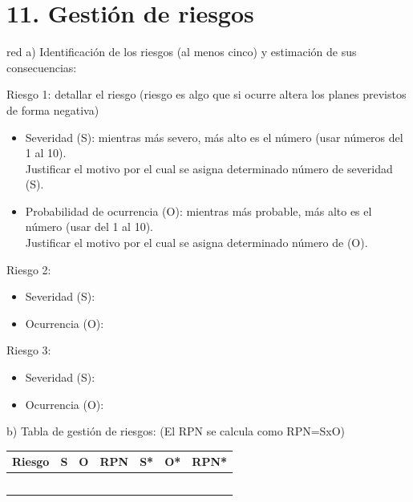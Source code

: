 \documentclass[
11pt, %
codirector, %
]{charter}
\begin{document}
\section{11. Gestión de riesgos}
\label{sec:riesgos}

\begin{consigna}{red}
a) Identificación de los riesgos (al menos cinco) y estimación de sus consecuencias:
 
Riesgo 1: detallar el riesgo (riesgo es algo que si ocurre altera los planes previstos de forma negativa)
\begin{itemize}
	\item Severidad (S): mientras más severo, más alto es el número (usar números del 1 al 10).\\
	Justificar el motivo por el cual se asigna determinado número de severidad (S).
	\item Probabilidad de ocurrencia (O): mientras más probable, más alto es el número (usar del 1 al 10).\\
	Justificar el motivo por el cual se asigna determinado número de (O). 
\end{itemize}   

Riesgo 2:
\begin{itemize}
	\item Severidad (S): 
	\item Ocurrencia (O):
\end{itemize}

Riesgo 3:
\begin{itemize}
	\item Severidad (S): 
	\item Ocurrencia (O):
\end{itemize}


b) Tabla de gestión de riesgos:      (El RPN se calcula como RPN=SxO)

\begin{table}[htpb]
\centering
\begin{tabularx}{\linewidth}{@{}|X|c|c|c|c|c|c|@{}}
\hline
\rowcolor[HTML]{C0C0C0} 
Riesgo & S & O & RPN & S* & O* & RPN* \\ \hline
       &   &   &     &    &    &      \\ \hline
       &   &   &     &    &    &      \\ \hline
       &   &   &     &    &    &      \\ \hline
       &   &   &     &    &    &      \\ \hline
       &   &   &     &    &    &      \\ \hline
\end{tabularx}%
\end{table}


\end{consigna}
\end{document}

